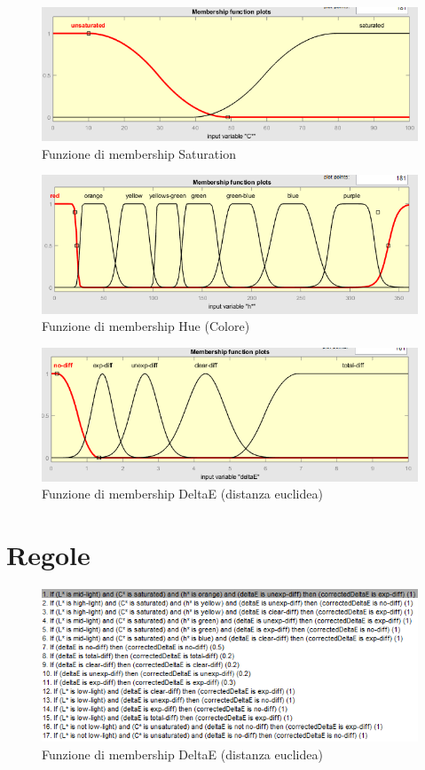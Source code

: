 \begin{figure}
\begin{center}
	\includegraphics[scale=0.8]{images/rete2-membership-saturation.PNG}
\end{center}
\caption{Funzione di membership Saturation}
\end{figure}

\begin{figure}
\begin{center}
	\includegraphics[scale=0.8]{images/rete2-membership-colors.PNG}
\end{center}
\caption{Funzione di membership Hue (Colore)}
\end{figure}

\begin{figure}
\begin{center}
	\includegraphics[scale=0.8]{images/rete2-membership-deltae.PNG}
\end{center}
\caption{Funzione di membership DeltaE (distanza euclidea)}
\end{figure}

\section{Regole}
\begin{figure}
\begin{center}
	\includegraphics[scale=1]{images/rete2-fuzzy-rules.PNG}
\end{center}
\caption{Funzione di membership DeltaE (distanza euclidea)}
\end{figure}